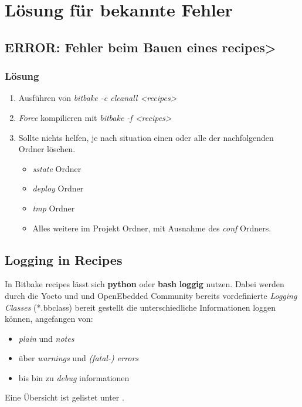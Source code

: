\chapter{Lösung für bekannte Fehler}%
\label{cha:losung_fur_bekannte_fehler}


\section{\textbf{ERROR:} Fehler beim Bauen eines recipes>}
\label{sec:fehler_beim_bauen_eines_images}


\subsection{Lösung}%
\label{sub:losung_fehler_beim_bauen_eines_images}


\begin{enumerate}
    \item Ausführen von \textit{bitbake -c cleanall <recipes>}
    \item \textit {Force} kompilieren mit  \textit{bitbake -f <recipes>}
    \item Sollte nichts helfen, je nach situation einen oder alle der
        nachfolgenden Ordner löschen.
    \begin{itemize}
        \item \textit{sstate} Ordner
        \item \textit{deploy} Ordner
        \item \textit{tmp} Ordner
        \item Alles weitere im Projekt Ordner, mit Ausnahme des \textit{conf}
            Ordners.
    \end{itemize}
\end{enumerate}



\section{Logging in Recipes}%
\label{sec:logging}
In Bitbake recipes lässt sich \textbf{python} oder \textbf{bash} \textbf{loggig}
nutzen. Dabei werden durch die Yocto und und OpenEbedded Community bereits
vordefinierte \textit{Logging Classes} (*.bbclass) bereit gestellt die
unterschiedliche Informationen loggen können, angefangen von:
\begin{itemize}
    \item \textit{plain} und \textit{notes}
    \item über \textit{warnings} und \textit{(fatal-) errors}
    \item bis bin zu \textit{debug} informationen
\end{itemize}
 Eine Übersicht ist gelistet unter
 \cite[S.79-80]{Gonzalez2018:Embedded_Linux_Development_Using_Yocto_Project_Cookbook_2nd}.

